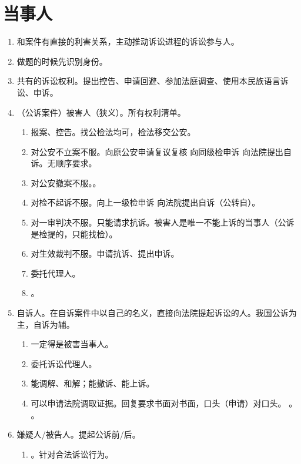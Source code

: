 \section{当事人}
\begin{enumerate}
  \item 和案件有直接的利害关系，主动推动诉讼进程的诉讼参与人。
  \item 做题的时候先识别身份。
  \item 共有的诉讼权利。提出控告、申请回避、参加法庭调查、使用本民族语言诉讼、申诉。
  \item （公诉案件）被害人（狭义）。所有权利清单。
        \begin{enumerate}
          \item 报案、控告。找公检法均可，检法移交公安。
          \item 对公安不立案不服。向原公安申请复议复核 \hz 向同级检申诉 \hz 向法院提出自诉。无顺序要求。
          \item 对公安撤案不服。。
          \item 对检不起诉不服。向上一级检申诉 \hz 向法院提出自诉（公转自）。
          \item 对一审判决不服。只能请求抗诉。被害人是唯一不能上诉的当事人（公诉是检提的，只能找检）。
          \item 对生效裁判不服。申请抗诉、提出申诉。
          \item 委托代理人。
          \item {}。
        \end{enumerate}
  \item 自诉人。在自诉案件中以自己的名义，直接向法院提起诉讼的人。我国公诉为主，自诉为辅。
        \begin{enumerate}
          \item 一定得是被害当事人。
          \item 委托诉讼代理人。
          \item 能调解、和解；能撤诉、能上诉。
          \item 可以申请法院调取证据。回复要求书面对书面，口头（申请）对口头。
                。
                。
        \end{enumerate}
  \item 嫌疑人/被告人。提起公诉前/后。
        \begin{enumerate}
          \item {}。针对合法诉讼行为。
                \begin{enumerate}

\end{enumerate}
\end{enumerate}
\end{enumerate}
